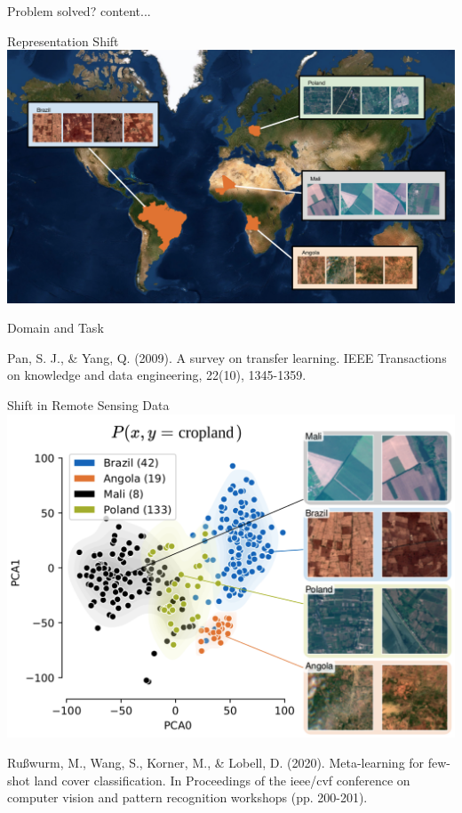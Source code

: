 \documentclass{beamer}
\begin{document}
	\begin{frame}{Problem solved?}
		content...
	\end{frame}

	\begin{frame}{Representation Shift}
		\includegraphics[width=\textwidth]{images/countries_globe}
	\end{frame}
	
	\begin{frame}{Domain and Task}
		\vfill\tiny
		{Pan, S. J., \& Yang, Q. (2009). A survey on transfer learning. IEEE Transactions on knowledge and data engineering, 22(10), 1345-1359.}
		
	\end{frame}

	\begin{frame}{Shift in Remote Sensing Data}
		\includegraphics[width=.9\textwidth]{images/Sen12ms_distribution_shift}
		
		{\tiny
		Rußwurm, M., Wang, S., Korner, M., \& Lobell, D. (2020). Meta-learning for few-shot land cover classification. In Proceedings of the ieee/cvf conference on computer vision and pattern recognition workshops (pp. 200-201).}
	\end{frame}
	
\end{document}
